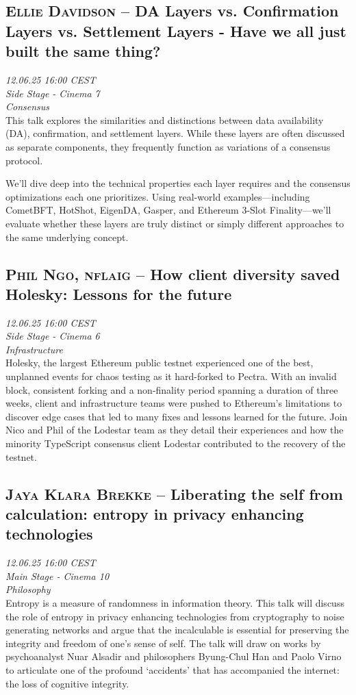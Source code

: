 \clearpage
\subsection {\textsc{Ellie Davidson}  -- DA Layers vs. Confirmation Layers vs. Settlement Layers - Have we all just built the same thing?} \noindent \textit {12.06.25 16:00 CEST\\ Side Stage - Cinema 7\\ Consensus}\\[1em] This talk explores the similarities and distinctions between data availability (DA), confirmation, and settlement layers. While these layers are often discussed as separate components, they frequently function as variations of a consensus protocol.

We’ll dive deep into the technical properties each layer requires and the consensus optimizations each one prioritizes. Using real-world examples—including CometBFT, HotShot, EigenDA, Gasper, and Ethereum 3-Slot Finality—we’ll evaluate whether these layers are truly distinct or simply different approaches to the same underlying concept.

\clearpage
\subsection {\textsc{Phil Ngo, nflaig}  -- How client diversity saved Holesky: Lessons for the future} \noindent \textit {12.06.25 16:00 CEST\\ Side Stage - Cinema 6\\ Infrastructure}\\[1em] Holesky, the largest Ethereum public testnet experienced one of the best, unplanned events for chaos testing as it hard-forked to Pectra. With an invalid block, consistent forking and a non-finality period spanning a duration of three weeks, client and infrastructure teams were pushed to Ethereum's limitations to discover edge cases that led to many fixes and lessons learned for the future. Join Nico and Phil of the Lodestar team as they detail their experiences and how the minority TypeScript consensus client Lodestar contributed to the recovery of the testnet.

\clearpage
\subsection {\textsc{Jaya Klara Brekke}  -- Liberating the self from calculation: entropy in privacy enhancing technologies} \noindent \textit {12.06.25 16:00 CEST\\ Main Stage - Cinema 10\\ Philosophy}\\[1em] Entropy is a measure of randomness in information theory. This talk will discuss the role of entropy in privacy enhancing technologies from cryptography to noise generating networks and argue that the incalculable is essential for preserving the integrity and freedom of one's sense of self. The talk will draw on works by psychoanalyst Nuar Alsadir and philosophers Byung-Chul Han and Paolo Virno to articulate one of the profound `accidents' that has accompanied the internet: the loss of cognitive integrity.

